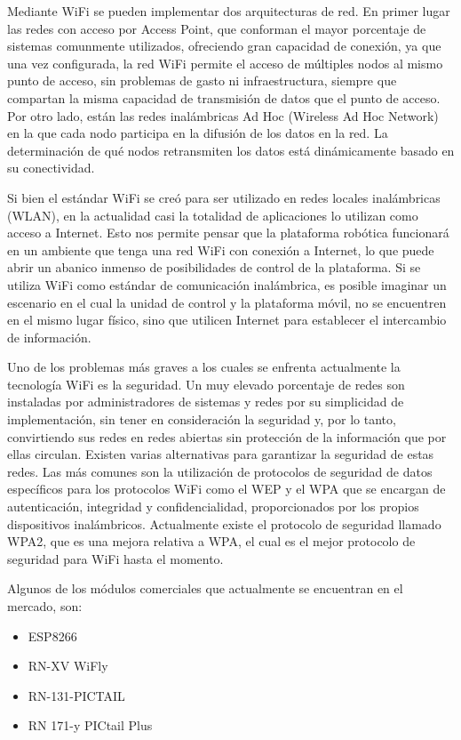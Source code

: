 \documentclass[conference,a4paper,9pt]{IEEEtran}
\begin{document}
Mediante WiFi se pueden implementar dos arquitecturas de red. En primer lugar las redes con acceso por Access Point, que conforman el mayor porcentaje de sistemas comunmente utilizados, ofreciendo gran capacidad de conexión, ya que una vez configurada, la red WiFi permite el acceso de múltiples nodos al mismo punto de acceso, sin problemas de gasto ni infraestructura, siempre que compartan la misma capacidad de transmisión de datos que el punto de acceso. Por otro lado, están las redes inalámbricas Ad Hoc (Wireless Ad Hoc Network) en la que cada nodo participa en la difusión de los datos en la red. La determinación de qué nodos retransmiten los datos está dinámicamente basado en su conectividad.

Si bien el estándar WiFi se creó para ser utilizado en redes locales inalámbricas (WLAN), en la actualidad casi la totalidad de aplicaciones lo utilizan como acceso a Internet. Esto nos permite pensar que la plataforma robótica funcionará en un ambiente que tenga una red WiFi con conexión a Internet, lo que puede abrir un abanico inmenso de posibilidades de control de la plataforma. Si se utiliza WiFi como estándar de comunicación inalámbrica, es posible imaginar un escenario en el cual la unidad de control y la plataforma móvil, no se encuentren en el mismo lugar físico, sino que utilicen Internet para establecer el intercambio de información.

Uno de los problemas más graves a los cuales se enfrenta actualmente la tecnología WiFi es la seguridad. Un muy elevado porcentaje de redes son instaladas por administradores de sistemas y redes por su simplicidad de implementación, sin tener en consideración la seguridad y, por lo tanto, convirtiendo sus redes en redes abiertas sin protección de la información que por ellas circulan. Existen varias alternativas para garantizar la seguridad de estas redes. Las más comunes son la utilización de protocolos de seguridad de datos específicos para los protocolos WiFi como el WEP y el WPA que se encargan de autenticación, integridad y confidencialidad, proporcionados por los propios dispositivos inalámbricos. Actualmente existe el protocolo de seguridad llamado WPA2, que es una mejora relativa a WPA, el cual es el mejor protocolo de seguridad para WiFi hasta el momento.

Algunos de los módulos comerciales que actualmente se encuentran en el mercado, son:

\begin{itemize}
	\item ESP8266
	\item RN-XV WiFly
	\item RN-131-PICTAIL
	\item RN 171-y PICtail Plus
\end{itemize}
\end{document}
